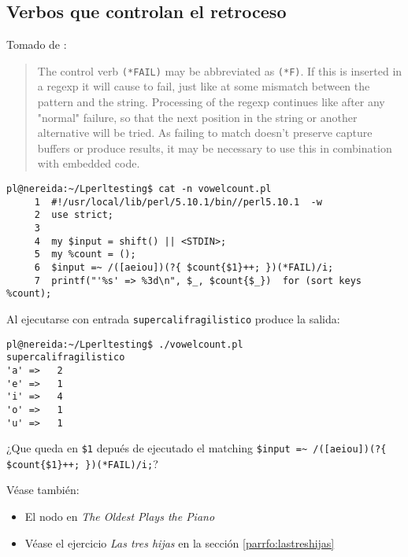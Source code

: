 \subsection{Verbos que controlan el retroceso}


Tomado de :

\begin{it}
\begin{quotation}
The control verb \verb|(*FAIL)| may be abbreviated as \verb|(*F)|. 
If this is inserted in a regexp it
will cause to fail, just like at some mismatch between the pattern and
the string. Processing of the regexp continues like after any "normal"
failure, so that the next position in the string or
another alternative will be tried. As failing to match doesn't preserve
capture buffers or produce results, it may be necessary to use this in
combination with embedded code.
\end{quotation}
\end{it}

\begin{verbatim}
pl@nereida:~/Lperltesting$ cat -n vowelcount.pl
     1  #!/usr/local/lib/perl/5.10.1/bin//perl5.10.1  -w
     2  use strict;
     3
     4  my $input = shift() || <STDIN>;
     5  my %count = ();
     6  $input =~ /([aeiou])(?{ $count{$1}++; })(*FAIL)/i;
     7  printf("'%s' => %3d\n", $_, $count{$_})  for (sort keys %count);
\end{verbatim}
Al ejecutarse con entrada \verb|supercalifragilistico| produce la salida:
\begin{verbatim}
pl@nereida:~/Lperltesting$ ./vowelcount.pl
supercalifragilistico
'a' =>   2
'e' =>   1
'i' =>   4
'o' =>   1
'u' =>   1
\end{verbatim}

\begin{exercise}
¿Que queda en \verb|$1| depués de ejecutado el matching 
\verb|$input =~ /([aeiou])(?{ $count{$1}++; })(*FAIL)/i;|?
\end{exercise}


Véase  también:
\begin{itemize}
\item
El nodo en  \emph{The Oldest Plays the Piano}
\item Véase el ejercicio {\it Las tres hijas} en la sección
\ref{parrfo:lastreshijas}
\end{itemize}

